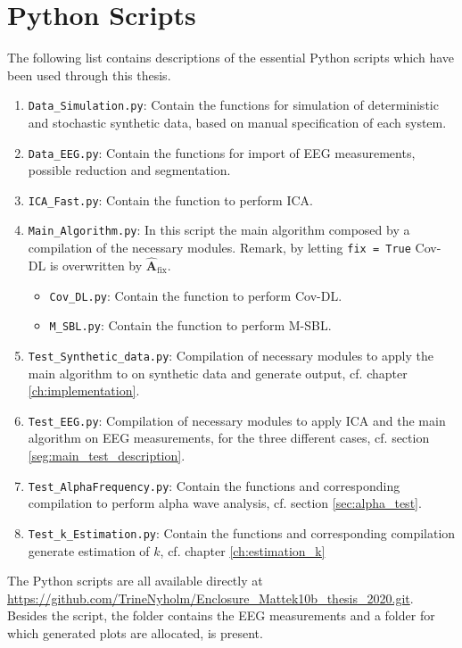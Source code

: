 \chapter{Python Scripts}\label{App:code}
The following list contains descriptions of the essential Python scripts which have been used through this thesis. 
\begin{enumerate}
\item \texttt{Data\_Simulation.py}: Contain the functions for simulation of deterministic and stochastic synthetic data, based on manual specification of each system.  
\item \texttt{Data\_EEG.py}: Contain the functions for import of EEG measurements, possible reduction and segmentation.  
\item \texttt{ICA\_Fast.py}: Contain the function to perform ICA.
\item \texttt{Main\_Algorithm.py}: In this script the main algorithm composed by a compilation of the necessary modules. Remark, by letting \texttt{fix = True} Cov-DL is overwritten by $\hat{\mathbf{A}}_{\text{fix}}$. 
\begin{itemize}
\item \texttt{Cov\_DL.py}: Contain the function to perform Cov-DL.
\item \texttt{M\_SBL.py}: Contain the function to perform M-SBL.
\end{itemize} 
\item \texttt{Test\_Synthetic\_data.py}: Compilation of necessary modules to apply the main algorithm to on synthetic data and generate output, cf. chapter \ref{ch:implementation}.
\item \texttt{Test\_EEG.py}: Compilation of necessary modules to apply ICA and the main algorithm on EEG measurements, for the three different cases, cf. section \ref{seg:main_test_description}.  
\item \texttt{Test\_AlphaFrequency.py}: Contain the functions and corresponding compilation to perform alpha wave analysis, cf. section \ref{sec:alpha_test}.
\item \texttt{Test\_k\_Estimation.py}: Contain the functions and corresponding compilation generate estimation of $k$, cf. chapter \ref{ch:estimation_k} 
\end{enumerate}
The Python scripts are all available directly at \url{https://github.com/TrineNyholm/Enclosure_Mattek10b_thesis_2020.git}. Besides the script, the folder contains the EEG measurements and a folder for which generated plots are allocated, is present.  


	                                                                                                                                                                                                                                                                 

